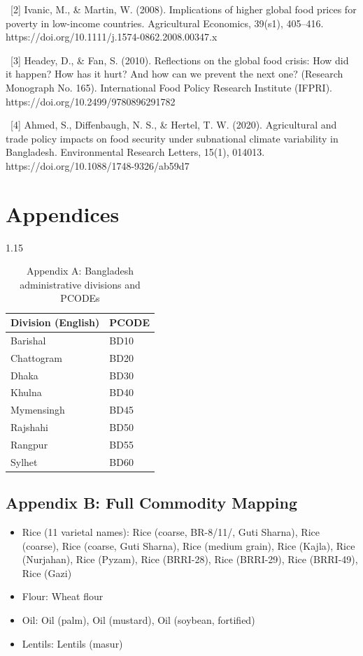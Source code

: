 \documentclass[12pt,a4paper]{article}
\begin{document}
~[2] Ivanic, M., \& Martin, W. (2008). Implications of higher global food prices for poverty in low-income countries. Agricultural Economics, 39(s1), 405--416. https://doi.org/10.1111/j.1574-0862.2008.00347.x

~[3] Headey, D., \& Fan, S. (2010). Reflections on the global food crisis: How did it happen? How has it hurt? And how can we prevent the next one? (Research Monograph No. 165). International Food Policy Research Institute (IFPRI). https://doi.org/10.2499/9780896291782

~[4] Ahmed, S., Diffenbaugh, N. S., \& Hertel, T. W. (2020). Agricultural and trade policy impacts on food security under subnational climate variability in Bangladesh. Environmental Research Letters, 15(1), 014013. https://doi.org/10.1088/1748-9326/ab59d7





\clearpage
\section*{Appendices}
\begin{table}[H]
\centering
\begin{spacing}{1.15}
\caption{Appendix A: Bangladesh administrative divisions and PCODEs}
\label{tab:divisions}
\begin{tabular}{ll}
\toprule
\textbf{Division (English)} & \textbf{PCODE} \\
\midrule
Barishal   & BD10 \\
Chattogram & BD20 \\
Dhaka      & BD30 \\
Khulna     & BD40 \\
Mymensingh & BD45 \\
Rajshahi   & BD50 \\
Rangpur    & BD55 \\
Sylhet     & BD60 \\
\bottomrule
\end{tabular}
\end{spacing}
\end{table}

\subsection*{Appendix B: Full Commodity Mapping}
\begin{itemize}[leftmargin=2em]
  \item Rice (11 varietal names): Rice (coarse, BR-8/11/, Guti Sharna), Rice (coarse), Rice (coarse, Guti Sharna), Rice (medium grain), Rice (Kajla), Rice (Nurjahan), Rice (Pyzam), Rice (BRRI-28), Rice (BRRI-29), Rice (BRRI-49), Rice (Gazi)
  \item Flour: Wheat flour
  \item Oil: Oil (palm), Oil (mustard), Oil (soybean, fortified)
  \item Lentils: Lentils (masur)
\end{itemize}
\end{document}
